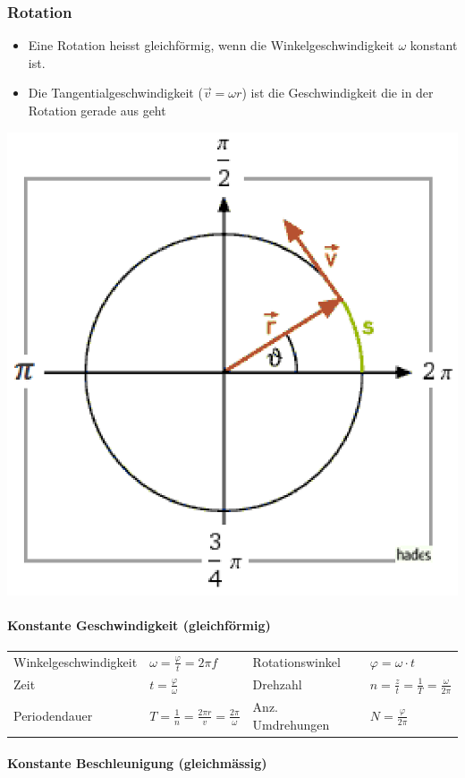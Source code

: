 \subsubsection{Rotation}

\begin{itemize}
	\item Eine Rotation heisst gleichförmig, wenn die Winkelgeschwindigkeit $\omega$ konstant ist. 
	\item Die Tangentialgeschwindigkeit ($\vec{v}=\omega r$) ist die Geschwindigkeit die in der Rotation gerade aus geht
\end{itemize}

\includegraphics[width=0.2\linewidth]{images/rotation}

\paragraph{Konstante Geschwindigkeit (gleichförmig)}

\begin{tabbing}
	\begin{tabu} to \linewidth {l X l X}
		\toprule
		Winkelgeschwindigkeit & $\omega = \frac{\varphi}{t} = 2 \pi f$ &
		Rotationswinkel & $\varphi = \omega \cdot t$ \\
		Zeit & $t = \frac{\varphi}{\omega}$ &
		Drehzahl & $n = \frac{z}{t} = \frac{1}{T} = \frac{\omega}{2 \pi}$  \\
		Periodendauer & $T = \frac{1}{n} = \frac{2\pi r}{v} = \frac{2\pi}{\omega}$ &
		Anz. Umdrehungen & $N = \frac{\varphi}{2 \pi}$ \\
		\bottomrule
	\end{tabu}
\end{tabbing}

\paragraph{Konstante Beschleunigung (gleichmässig)}

